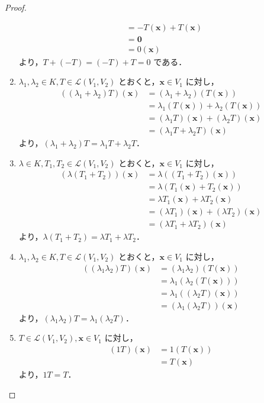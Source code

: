 \documentclass{jlreq}
\theoremstyle{definition}
\begin{document}
\begin{proof}
\begin{enumerate}
\begin{align*}
              &= -T(\bm{x})+T(\bm{x}) \\
              &= \bm{0} \\
              &= 0(\bm{x})
            \end{align*}
            より，$T+(-T)=(-T)+T=0$ である．
          \item $\lambda_1,\lambda_2 \in K, T \in \mathcal{L}(V_1,V_2)$ とおくと，$\bm{x} \in V_1$ に対し，
            \begin{align*}
              ((\lambda_1+\lambda_2)T)(\bm{x}) &= (\lambda_1+\lambda_2)(T(\bm{x})) \\
              &= \lambda_1(T(\bm{x}))+\lambda_2(T(\bm{x})) \\
              &= (\lambda_1T)(\bm{x})+(\lambda_2T)(\bm{x}) \\
              &= (\lambda_1T+\lambda_2T)(\bm{x})
            \end{align*}
            より，$(\lambda_1+\lambda_2)T=\lambda_1T+\lambda_2T$．
          \item $\lambda \in K, T_1,T_2 \in \mathcal{L}(V_1,V_2)$ とおくと，$\bm{x} \in V_1$ に対し，
            \begin{align*}
              (\lambda(T_1+T_2))(\bm{x}) &= \lambda((T_1+T_2)(\bm{x})) \\
              &= \lambda(T_1(\bm{x})+T_2(\bm{x})) \\
              &= \lambda T_1(\bm{x})+\lambda T_2(\bm{x}) \\
              &= (\lambda T_1)(\bm{x})+(\lambda T_2)(\bm{x}) \\
              &= (\lambda T_1 + \lambda T_2)(\bm{x})
            \end{align*}
            より，$\lambda(T_1+T_2)=\lambda T_1 + \lambda T_2$．
          \item $\lambda_1,\lambda_2 \in K, T \in \mathcal{L}(V_1,V_2)$ とおくと，$\bm{x} \in V_1$ に対し，
            \begin{align*}
              ((\lambda_1\lambda_2)T)(\bm{x}) &= (\lambda_1\lambda_2)(T(\bm{x})) \\
              &= \lambda_1(\lambda_2(T(\bm{x}))) \\
              &= \lambda_1((\lambda_2 T)(\bm{x})) \\
              &= (\lambda_1(\lambda_2 T))(\bm{x})
            \end{align*}
            より，$(\lambda_1\lambda_2)T=\lambda_1(\lambda_2 T)$．
          \item $T \in \mathcal{L}(V_1,V_2), \bm{x} \in V_1$ に対し，
            \begin{align*}
              (1T)(\bm{x}) &= 1(T(\bm{x})) \\
              &= T(\bm{x})
            \end{align*}
            より，$1T=T$．
        \end{enumerate}
      \end{proof}
\end{document}

